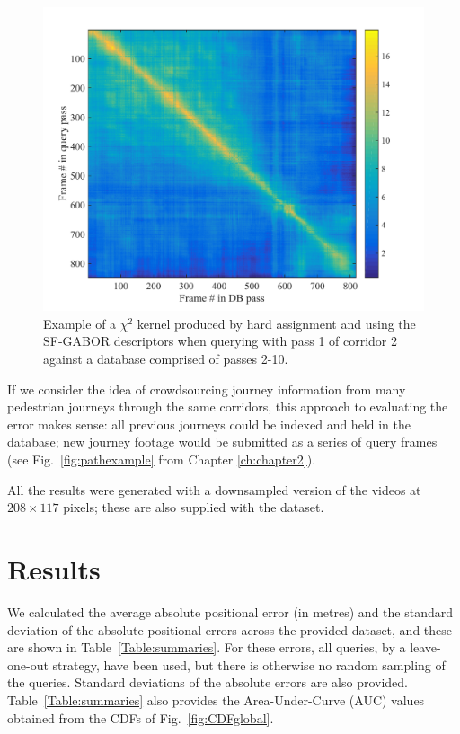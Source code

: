 \begin{figure}[h]
\centering
\includegraphics[width=\linewidth]{./gfx/Chapter04/kernel.pdf}
\caption{Example of a $\chi^2$ kernel produced by hard assignment and using the SF-GABOR descriptors when querying with pass 1 of corridor 2 against a database comprised of passes 2-10.}
\label{fig:kernel}
\end{figure}

If we consider the idea of crowdsourcing journey information from many pedestrian journeys through the same corridors, this approach to evaluating the error makes sense:  all previous journeys could be indexed and held in the database; new journey footage would be submitted as a series of query frames (see Fig.~\ref{fig:pathexample} from Chapter \ref{ch:chapter2}).    

All the results were generated with a downsampled version of the videos at $208 \times 117$ pixels; these are also supplied with the dataset. 




\section{Results}
\label{sec:ch4results}

We calculated the average absolute positional error (in metres) and the standard deviation of the absolute positional errors across the provided dataset, and these are shown in Table~\ref{Table:summaries}. For these errors, all queries, by a leave-one-out strategy, have been used, but there is otherwise no random sampling of the queries.  Standard deviations of the absolute errors are also provided.  Table~\ref{Table:summaries} also provides the Area-Under-Curve (AUC) values obtained from the CDFs of Fig.~\ref{fig:CDFglobal}.



